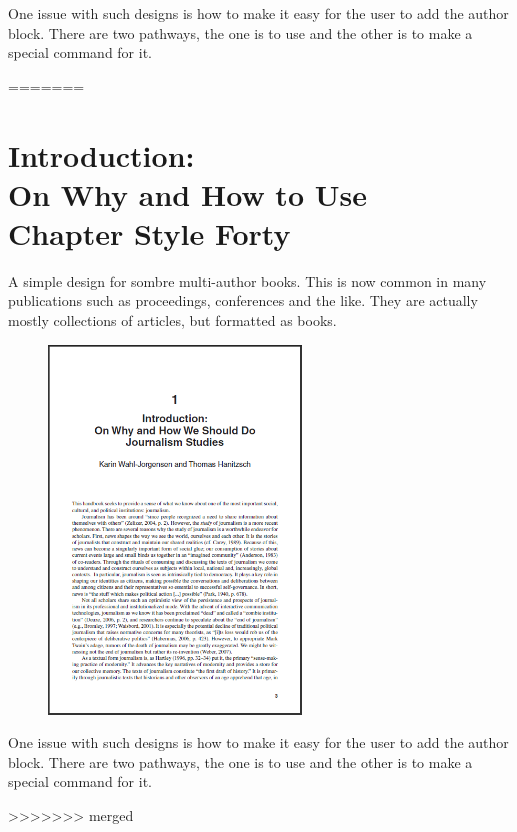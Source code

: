 One issue with such designs is how to make it easy for the user to add the author block. There are two pathways, the one is to use  and the other is to make a special command for it.

=======




\chapter{Introduction:\\ On Why and How to Use\\ Chapter Style Forty}

A simple design for sombre multi-author books. This is now common in many publications such as proceedings, conferences and the like. They are actually mostly collections of articles, but formatted as books.

\begin{figure}[ht]
\centering
\includegraphics[width=0.6\textwidth]{./chapters/chapter40}
\end{figure}

One issue with such designs is how to make it easy for the user to add the author block. There are two pathways, the one is to use  and the other is to make a special command for it.

>>>>>>> merged
